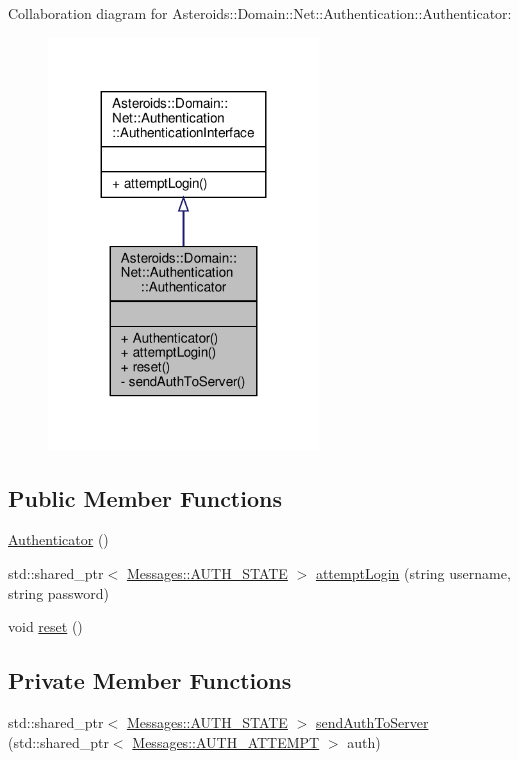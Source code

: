 Collaboration diagram for Asteroids\+:\+:Domain\+:\+:Net\+:\+:Authentication\+:\+:Authenticator\+:\nopagebreak
\begin{figure}[H]
\begin{center}
\leavevmode
\includegraphics[width=203pt]{classAsteroids_1_1Domain_1_1Net_1_1Authentication_1_1Authenticator__coll__graph}
\end{center}
\end{figure}
\subsection*{Public Member Functions}
\begin{DoxyCompactItemize}
\item 
\hyperlink{classAsteroids_1_1Domain_1_1Net_1_1Authentication_1_1Authenticator_afadb967c25e27246382ace3ffe9ee85a}{Authenticator} ()
\item 
std\+::shared\+\_\+ptr$<$ \hyperlink{classAsteroids_1_1Domain_1_1Net_1_1Messages_1_1AUTH__STATE}{Messages\+::\+A\+U\+T\+H\+\_\+\+S\+T\+A\+TE} $>$ \hyperlink{classAsteroids_1_1Domain_1_1Net_1_1Authentication_1_1Authenticator_a1dd2c0964bae0658b8477c7d041f62d5}{attempt\+Login} (string username, string password)
\item 
void \hyperlink{classAsteroids_1_1Domain_1_1Net_1_1Authentication_1_1Authenticator_adcb0d071c190cabc1333ab81ae2c9650}{reset} ()
\end{DoxyCompactItemize}
\subsection*{Private Member Functions}
\begin{DoxyCompactItemize}
\item 
std\+::shared\+\_\+ptr$<$ \hyperlink{classAsteroids_1_1Domain_1_1Net_1_1Messages_1_1AUTH__STATE}{Messages\+::\+A\+U\+T\+H\+\_\+\+S\+T\+A\+TE} $>$ \hyperlink{classAsteroids_1_1Domain_1_1Net_1_1Authentication_1_1Authenticator_a8a8edfa95f03ea7dc5ca921f1e1ca622}{send\+Auth\+To\+Server} (std\+::shared\+\_\+ptr$<$ \hyperlink{classAsteroids_1_1Domain_1_1Net_1_1Messages_1_1AUTH__ATTEMPT}{Messages\+::\+A\+U\+T\+H\+\_\+\+A\+T\+T\+E\+M\+PT} $>$ auth)
\end{DoxyCompactItemize}


